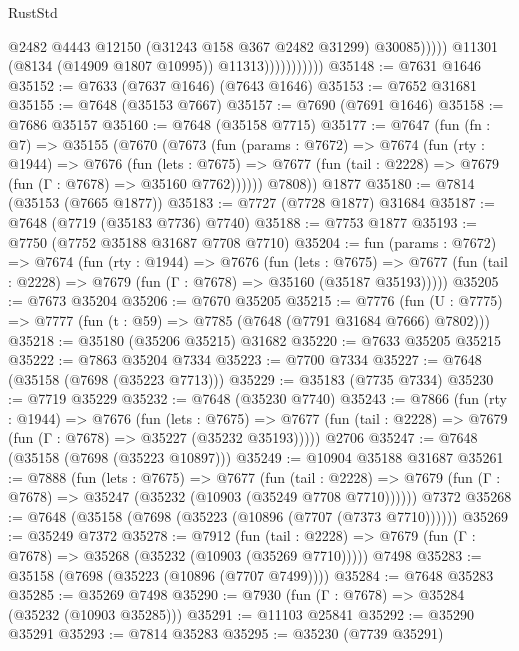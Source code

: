 \begin{lexlean}{RustStd}
\begin{coremodule}
{\begin{coremodule}
{{{{{{{{{{{{{{{{{{{{{{{{{{{{{{{{{{{{{{{{{{{{{{{{{{{{{                                    @2482
                                    @4443
                                    @12150
                                    (@31243 @158 @367 @2482 @31299)
                                    @30085)))))
                          @11301
                          (@8134 (@14909 @1807 @10995))
                          @11313)))))))))))
@35148 := @7631 @1646
@35152 := @7633 (@7637 @1646) (@7643 @1646)
@35153 := @7652 @31681
@35155 := @7648 (@35153 @7667)
@35157 := @7690 (@7691 @1646)
@35158 := @7686 @35157
@35160 := @7648 (@35158 @7715)
@35177 := @7647
    (fun (fn : @7) =>
    @35155
      (@7670
        (@7673
          (fun (params : @7672) =>
          @7674
            (fun (rty : @1944) =>
            @7676
              (fun (lets : @7675) =>
              @7677 (fun (tail : @2228) => @7679 (fun (Γ : @7678) => @35160 @7762))))))
        @7808))
    @1877
@35180 := @7814 (@35153 (@7665 @1877))
@35183 := @7727 (@7728 @1877) @31684
@35187 := @7648 (@7719 (@35183 @7736) @7740)
@35188 := @7753 @1877
@35193 := @7750 (@7752 @35188 @31687 @7708 @7710)
@35204 := fun (params : @7672) =>
  @7674
    (fun (rty : @1944) =>
    @7676
      (fun (lets : @7675) =>
      @7677 (fun (tail : @2228) => @7679 (fun (Γ : @7678) => @35160 (@35187 @35193)))))
@35205 := @7673 @35204
@35206 := @7670 @35205
@35215 := @7776
    (fun (U : @7775) => @7777 (fun (t : @59) => @7785 (@7648 (@7791 @31684 @7666) @7802)))
@35218 := @35180 (@35206 @35215) @31682
@35220 := @7633 @35205 @35215
@35222 := @7863 @35204 @7334
@35223 := @7700 @7334
@35227 := @7648 (@35158 (@7698 (@35223 @7713)))
@35229 := @35183 (@7735 @7334)
@35230 := @7719 @35229
@35232 := @7648 (@35230 @7740)
@35243 := @7866
    (fun (rty : @1944) =>
    @7676
      (fun (lets : @7675) =>
      @7677 (fun (tail : @2228) => @7679 (fun (Γ : @7678) => @35227 (@35232 @35193)))))
    @2706
@35247 := @7648 (@35158 (@7698 (@35223 @10897)))
@35249 := @10904 @35188 @31687
@35261 := @7888
    (fun (lets : @7675) =>
    @7677
      (fun (tail : @2228) =>
      @7679 (fun (Γ : @7678) => @35247 (@35232 (@10903 (@35249 @7708 @7710))))))
    @7372
@35268 := @7648 (@35158 (@7698 (@35223 (@10896 (@7707 (@7373 @7710))))))
@35269 := @35249 @7372
@35278 := @7912
    (fun (tail : @2228) => @7679 (fun (Γ : @7678) => @35268 (@35232 (@10903 (@35269 @7710)))))
    @7498
@35283 := @35158 (@7698 (@35223 (@10896 (@7707 @7499))))
@35284 := @7648 @35283
@35285 := @35269 @7498
@35290 := @7930 (fun (Γ : @7678) => @35284 (@35232 (@10903 @35285)))
@35291 := @11103 @25841
@35292 := @35290 @35291
@35293 := @7814 @35283
@35295 := @35230 (@7739 @35291)
}}}}}}}}}}}}}}}}}}}}}}}}}}}}}}}}}}}}}}}}}}}}}}}}}}}}}
\end{coremodule}}
\end{coremodule}
\end{lexlean}
